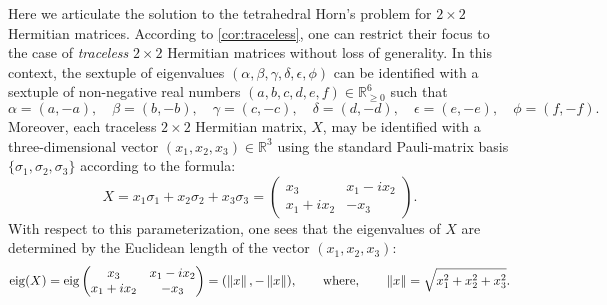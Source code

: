 \documentclass[notitlepage, 10pt]{article}
\begin{document}
\begin{exam}[Tetrahedral Horn's problem for \texorpdfstring{$d=2$}{d=2}]
    \label{exam:d_2}
    Here we articulate the solution to the tetrahedral Horn's problem for $2\times 2$ Hermitian matrices.
    According to \cref{cor:traceless}, one can restrict their focus to the case of \textit{traceless} $2 \times 2$ Hermitian matrices without loss of generality.
    In this context, the sextuple of eigenvalues $(\alpha,\beta,\gamma,\delta,\epsilon,\phi)$ can be identified with a sextuple of non-negative real numbers $(a,b,c,d,e,f) \in \mathbb R_{\geq 0}^{6}$ such that
    \begin{equation}
        \label{eq:traceless_two_dim_tetra}
        \alpha = (a, -a), \quad
        \beta = (b, -b), \quad
        \gamma = (c, -c), \quad
        \delta = (d, -d), \quad
        \epsilon = (e, -e), \quad
        \phi = (f, -f).
    \end{equation}
    Moreover, each traceless $2 \times 2$ Hermitian matrix, $X$, may be identified with a three-dimensional vector $(x_1, x_2, x_3) \in \mathbb R^{3}$ using the standard Pauli-matrix basis $\{\sigma_1, \sigma_2, \sigma_3\}$ according to the formula:
    \begin{equation}
        X = x_1 \sigma_1 + x_2 \sigma_2 + x_3 \sigma_3 = \begin{pmatrix} x_3 & x_1-ix_2 \\ x_1+ix_2 & -x_3 \end{pmatrix}.
    \end{equation}
    With respect to this parameterization, one sees that the eigenvalues of $X$ are determined by the Euclidean length of the vector $(x_1, x_2, x_3)$:
    \begin{equation}
        \eig(X) = \eig\begin{pmatrix} x_3 & x_1-ix_2 \\ x_1+ix_2 & -x_3 \end{pmatrix} = (\norm{x}, -\norm{x}), \qquad \text{where}, \qquad \norm{x} = \sqrt{x_1^2 + x_2^2 + x_3^2}.

\end{equation}
\end{exam}
\end{document}
